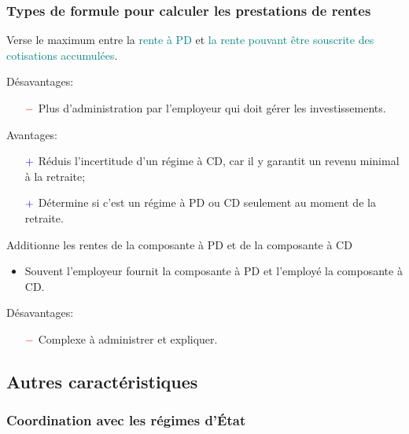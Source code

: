 \documentclass[10pt, french]{article}
\begin{document}
\begin{multicols*}{3}
\subsubsection*{Types de formule pour calculer les prestations de rentes}

\begin{definitionNOHFILL}
Verse le maximum entre la \textcolor{teal}{rente à PD} et \textcolor{teal}{la rente pouvant être souscrite des cotisations accumulées}.


Désavantages:
\begin{itemize}
	\item[$\color{red}-$]	Plus d'administration par l'employeur qui doit gérer les investissements.
\end{itemize}

Avantages:
\begin{itemize}
	\item[$\color{blue}+$]	Réduis l'incertitude d'un régime à CD, car il y garantit un revenu minimal à la retraite;
	\item[$\color{blue}+$]	Détermine si c'est un régime à PD ou CD seulement au moment de la retraite.
\end{itemize}
\end{definitionNOHFILL}

\begin{definitionNOHFILL}[Combiné]
Additionne les rentes de la composante à PD et de la composante à CD

\begin{itemize}[leftmargin = *]
	\item	Souvent l'employeur fournit la composante à PD et l'employé la composante à CD.
\end{itemize}

Désavantages:
\begin{itemize}
	\item[$\color{red}-$]	Complexe à administrer et expliquer.
\end{itemize}
\end{definitionNOHFILL}

\columnbreak

\subsection{Autres caractéristiques}

\subsubsection*{Coordination avec les régimes d'État}

\end{multicols*}
\end{document}
